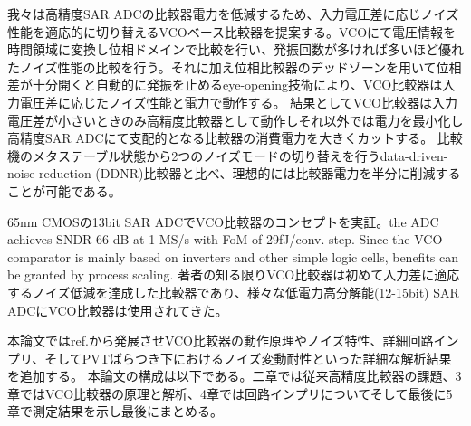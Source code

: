 \documentclass[letterpaper, 10 pt, conference]{ieeeconf}  %
\begin{document}
我々は高精度SAR ADCの比較器電力を低減するため、入力電圧差に応じノイズ性能を適応的に切り替えるVCOベース比較器を提案する\cite{yoshioka201413b}。VCOにて電圧情報を時間領域に変換し位相ドメインで比較を行い、発振回数が多ければ多いほど優れたノイズ性能の比較を行う。それに加え位相比較器のデッドゾーンを用いて位相差が十分開くと自動的に発振を止めるeye-opening技術により、VCO比較器は入力電圧差に応じたノイズ性能と電力で動作する。
結果としてVCO比較器は入力電圧差が小さいときのみ高精度比較器として動作しそれ以外では電力を最小化し高精度SAR ADCにて支配的となる比較器の消費電力を大きくカットする。
比較機のメタステーブル状態から2つのノイズモードの切り替えを行うdata-driven-noise-reduction (DDNR)比較器\cite{harpe201310b}と比べ、理想的には比較器電力を半分に削減することが可能である。

65nm CMOSの13bit SAR ADCでVCO比較器のコンセプトを実証。the ADC achieves SNDR 66 dB at 1 MS/s with FoM of 29fJ/conv.-step. Since the VCO comparator is mainly based on inverters and other simple logic cells, benefits can be granted by process scaling.
著者の知る限りVCO比較器は初めて入力差に適応するノイズ低減を達成した比較器であり、様々な低電力高分解能(12-15bit) SAR ADCにVCO比較器は使用されてきた\cite{ding20190, luo2020input, hsieh20180, li2019design, li202065, almarashli2017nyquist, shim2017edge, zhu201914, pan202012, lee2019fast}。

本論文ではref.\cite{yoshioka201413b}から発展させVCO比較器の動作原理やノイズ特性、詳細回路インプリ、そしてPVTばらつき下におけるノイズ変動耐性といった詳細な解析結果を追加する。
本論文の構成は以下である。二章では従来高精度比較器の課題、3章ではVCO比較器の原理と解析、4章では回路インプリについてそして最後に5章で測定結果を示し最後にまとめる。
\end{document}
